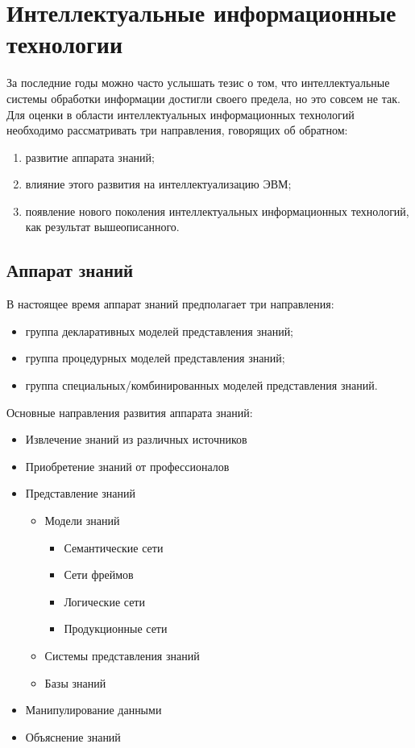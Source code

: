 \documentclass[a4paper,12pt]{report}
\begin{document}
\section{Интеллектуальные информационные технологии}

	За последние годы можно часто услышать тезис о том, что интеллектуальные
	системы обработки информации достигли своего предела, но это совсем не
	так. Для оценки в области интеллектуальных информационных технологий
	необходимо рассматривать три направления, говорящих об обратном:
	\begin{enumerate}
		\item развитие аппарата знаний;
		\item влияние этого развития на интеллектуализацию ЭВМ;
		\item появление нового поколения интеллектуальных информационных
			технологий, как результат вышеописанного.
	\end{enumerate}


\subsection{Аппарат знаний}

	В настоящее время аппарат знаний предполагает три направления:
	\begin{itemize}
		\item группа декларативных моделей представления знаний;
		\item группа процедурных моделей представления знаний;
		\item группа специальных/комбинированных моделей представления знаний. \\
	\end{itemize}

	Основные направления развития аппарата знаний:
	\begin{itemize}
		\item Извлечение знаний из различных источников
		\item Приобретение знаний от профессионалов
		\item Представление знаний
			\begin{itemize}
				\item Модели знаний
					\begin{itemize}
						\item Семантические сети
						\item Сети фреймов
						\item Логические сети
						\item Продукционные сети
					\end{itemize}
				\item Системы представления знаний
				\item Базы знаний
			\end{itemize}
		\item Манипулирование данными
		\item Объяснение знаний \\
	\end{itemize}
\end{document}
